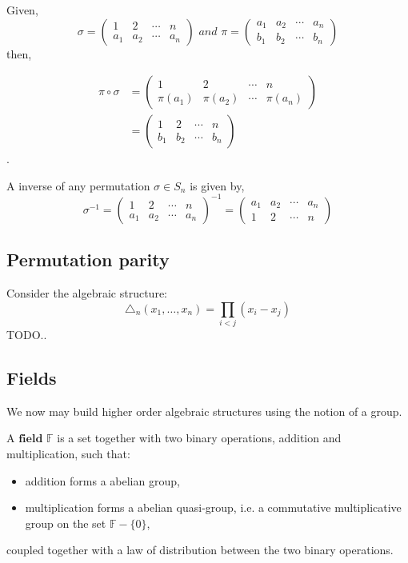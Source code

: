 Given,
\[
 \sigma =
 \begin{pmatrix}
  1 & 2 & \cdots & n \\
  a_1 & a_2 & \cdots & a_n
 \end{pmatrix}
 \, \, and \, \,
 \pi =
 \begin{pmatrix}
  a_1 & a_2 & \cdots & a_n \\
  b_1 & b_2 & \cdots & b_n
 \end{pmatrix}
\]
then,

\begin{align*}
 \pi \circ \sigma &=
 \begin{pmatrix}
  1 & 2 & \cdots & n \\
  \pi(a_1) & \pi(a_2) & \cdots & \pi(a_n)
 \end{pmatrix}
 \\
 &=
 \begin{pmatrix}
  1 & 2 & \cdots & n \\
  b_1 & b_2 & \cdots & b_n
 \end{pmatrix}
\end{align*}
.

A inverse of any permutation $\sigma \in S_n$ is given by,
\[
 \sigma^{-1} =
 \begin{pmatrix}
  1 & 2 & \cdots & n \\
  a_1 & a_2 & \cdots & a_n
 \end{pmatrix}^{-1}
 =
 \begin{pmatrix}
  a_1 & a_2 & \cdots & a_n \\
  1 & 2 & \cdots & n
 \end{pmatrix}
\]

\subsection{Permutation parity}
Consider the algebraic structure:
\[
	\triangle_n (x_1, \dots , x_n) = \prod_{i<j} (x_i - x_j)
\]
TODO..

\subsection{Fields} %
\label{subsec:fields}
We now may build higher order algebraic structures using the notion of a group.

\begin{defn}[Field]
	A $\textbf{field}$ $\mathbb{F}$ is a set together with two binary operations, addition and multiplication, such that:
	\begin{itemize}
		\item addition forms a abelian group,
		\item multiplication forms a abelian quasi-group, i.e. a commutative multiplicative group on the set $\mathbb{F} - \{0\}$, 
	\end{itemize}
	coupled together with a law of distribution between the two binary operations.
\end{defn}
